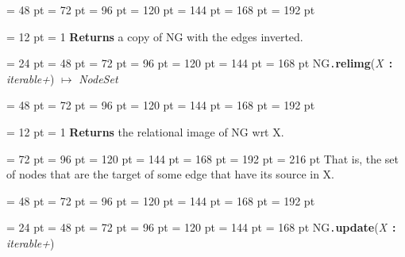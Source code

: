 {{{{\par \noindent  \leftskip = 48 pt  \leftmargini = 72 pt  \leftmarginii = 96 pt  \leftmarginiii = 120 pt  \leftmarginiv = 144 pt  \leftmarginv = 168 pt  \leftmarginvi = 192 pt {\par \noindent
{\par \pagebreak[3.100000] \noindent \hangindent = 12 pt \hangafter = 1 
{\bf Returns \/} a copy of NG with the edges inverted.
\par}
\par}
\par}
\par}
\par}
{\par \noindent  \leftskip = 24 pt  \leftmargini = 48 pt  \leftmarginii = 72 pt  \leftmarginiii = 96 pt  \leftmarginiv = 120 pt  \leftmarginv = 144 pt  \leftmarginvi = 168 pt NG{\tt .\/}{\bf {\large {\bf relimg\/}}\/}({\em X\/}~{\bf :}  {\em iterable+\/}) \(\mapsto \)  {\em NodeSet\/}{\par \noindent
{\par \noindent  \leftskip = 48 pt  \leftmargini = 72 pt  \leftmarginii = 96 pt  \leftmarginiii = 120 pt  \leftmarginiv = 144 pt  \leftmarginv = 168 pt  \leftmarginvi = 192 pt {\par \noindent
{\par \pagebreak[3.100000] \noindent \hangindent = 12 pt \hangafter = 1 
{\bf Returns \/} the relational image of NG wrt X.\par}
{\par \noindent  \leftskip = 72 pt  \leftmargini = 96 pt  \leftmarginii = 120 pt  \leftmarginiii = 144 pt  \leftmarginiv = 168 pt  \leftmarginv = 192 pt  \leftmarginvi = 216 pt  That is, the set of nodes that are the target of some edge that have
       its source in X.\par}
\par}
\par}
{\par \noindent  \leftskip = 48 pt  \leftmargini = 72 pt  \leftmarginii = 96 pt  \leftmarginiii = 120 pt  \leftmarginiv = 144 pt  \leftmarginv = 168 pt  \leftmarginvi = 192 pt {\par \noindent
\par}
\par}
\par}
\par}
{\par \noindent  \leftskip = 24 pt  \leftmargini = 48 pt  \leftmarginii = 72 pt  \leftmarginiii = 96 pt  \leftmarginiv = 120 pt  \leftmarginv = 144 pt  \leftmarginvi = 168 pt NG{\tt .\/}{\bf {\large {\bf update\/}}\/}({\em X\/}~{\bf :}  {\em iterable+\/}){\par \noindent
}}}
